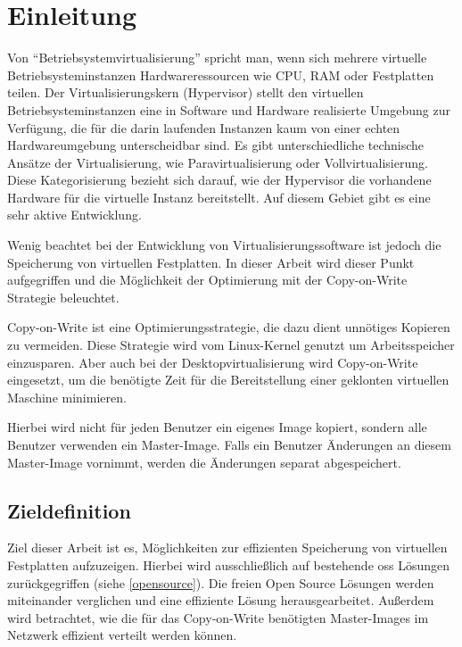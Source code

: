 \chapter{Einleitung}
Von ``Betriebsystemvirtualisierung'' spricht man, wenn sich mehrere virtuelle Betriebsysteminstanzen Hardwareressourcen wie CPU, RAM oder Festplatten teilen. Der Virtualisierungskern (Hypervisor) stellt den virtuellen Betriebsysteminstanzen eine in Software und Hardware realisierte Umgebung zur Verfügung, die für die darin laufenden Instanzen kaum von einer echten Hardwareumgebung unterscheidbar sind. Es gibt unterschiedliche technische Ansätze der Virtualisierung, wie Paravirtualisierung oder Vollvirtualisierung. Diese Kategorisierung bezieht sich darauf, wie der Hypervisor die vorhandene Hardware für die virtuelle Instanz bereitstellt. Auf diesem Gebiet gibt es eine sehr aktive Entwicklung. \cite{andrep} \cite{baun}

Wenig beachtet bei der Entwicklung von Virtualisierungssoftware ist jedoch die Speicherung von virtuellen Festplatten. In dieser Arbeit wird dieser Punkt aufgegriffen und die Möglichkeit der Optimierung mit der Copy-on-Write Strategie beleuchtet.

Copy-on-Write ist eine Optimierungsstrategie, die dazu dient unnötiges Kopieren zu vermeiden. Diese Strategie wird vom Linux-Kernel genutzt um Arbeitsspeicher einzusparen. Aber auch bei der Desktopvirtualisierung wird Copy-on-Write eingesetzt, um die benötigte Zeit für die Bereitstellung einer geklonten virtuellen Maschine minimieren.
\begin{comment}Zusätzlich werden die Systemressourcen (Storage, IO, CPU) des physikalischen Virtualisierungsservers geschont.\end{comment}
Hierbei wird nicht für jeden Benutzer ein eigenes Image kopiert, sondern alle Benutzer verwenden ein Master-Image. Falls ein Benutzer Änderungen an diesem Master-Image vornimmt, werden die Änderungen separat abgespeichert. 

\section{Zieldefinition}
Ziel dieser Arbeit ist es, Möglichkeiten zur effizienten Speicherung von virtuellen Festplatten aufzuzeigen. Hierbei wird ausschließlich auf bestehende \gls{oss} Lösungen zurückgegriffen (siehe \ref{opensource}). Die freien Open Source Lösungen werden miteinander verglichen und eine effiziente Lösung herausgearbeitet. Außerdem wird betrachtet, wie die für das Copy-on-Write benötigten Master-Images im Netzwerk effizient verteilt werden können.  

